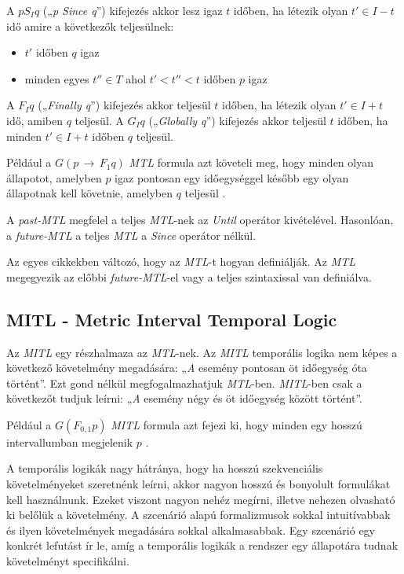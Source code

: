 A $p S_I q$ („\textit{p Since q}”) kifejezés akkor lesz igaz $t$ időben, ha létezik olyan $t' \in I - t$ idő amire a következők teljesülnek:
\begin{itemize}
    \item $t'$ időben $q$ igaz
    \item minden egyes $t'' \in T$ ahol $t' < t'' < t$ időben $p$ igaz
\end{itemize}

A $F_I q$ („\textit{Finally q}”) kifejezés akkor teljesül $t$ időben, ha létezik olyan $t' \in I + t$ idő, amiben $q$ teljesül.
A $G_I q$ („\textit{Globally q}”) kifejezés akkor teljesül $t$ időben, ha minden $t' \in I + t$ időben $q$ teljesül.

Például a $G(p \,\to\, F_{1} q)$ \textit{MTL} formula azt követeli meg, hogy minden olyan állapotot, amelyben $p$ igaz pontosan egy időegységgel később egy olyan állapotnak kell követnie, amelyben $q$ teljesül \cite{MTL1}.

A \textit{past-MTL} megfelel a teljes \textit{MTL}-nek az \textit{Until} operátor kivételével.
Hasonlóan, a \textit{future-MTL} a teljes \textit{MTL} a \textit{Since} operátor nélkül.

Az egyes cikkekben változó, hogy az \textit{MTL}-t hogyan definiálják.
Az \textit{MTL} megegyezik az előbbi \textit{future-MTL}-el vagy a teljes szintaxissal van definiálva.

\subsection{MITL - Metric Interval Temporal Logic}

Az \textit{MITL} \cite{MITL1} egy részhalmaza az \textit{MTL}-nek.
Az \textit{MITL} temporális logika nem képes a következő követelmény megadására: „\textit{A} esemény pontosan öt időegység óta történt”.
Ezt gond nélkül megfogalmazhatjuk \textit{MTL}-ben.
\textit{MITL}-ben csak a következőt tudjuk leírni: „\textit{A} esemény négy és öt időegység között történt”.

Például a $G(F_{0,1}p)$ \textit{MITL} formula azt fejezi ki, hogy minden egy hosszú intervallumban megjelenik $p$ \cite{MITL1}.

A temporális logikák nagy hátránya, hogy ha hosszú szekvenciális követelményeket szeretnénk leírni, akkor nagyon hosszú és bonyolult formulákat kell használnunk.
Ezeket viszont nagyon nehéz megírni, illetve nehezen olvasható ki belőlük a követelmény.
A szcenárió alapú formalizmusok sokkal intuitívabbak és ilyen követelmények megadására sokkal alkalmasabbak.
Egy szcenárió egy konkrét lefutást ír le, amíg a temporális logikák a rendszer egy állapotára tudnak követelményt specifikálni.

